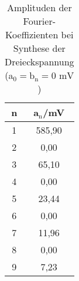 \begin{table}[h]
	\begin{center}
		\begin{tabular}{cc}
			n&a$_\text{n}$/mV \\ \hline
			1&585,90\\
			2&0,00\\
			3&65,10\\
			4&0,00\\
			5&23,44\\
			6&0,00\\
			7&11,96\\
			8&0,00\\
			9&7,23
		\end{tabular}
		\caption{Amplituden der Fourier-Koeffizienten bei Synthese der Dreieckspannung (a$_\text{0}=\text{b}_\text{n}=0\text{ mV}$)}
		\label{tabfsd}
	\end{center}
\end{table}